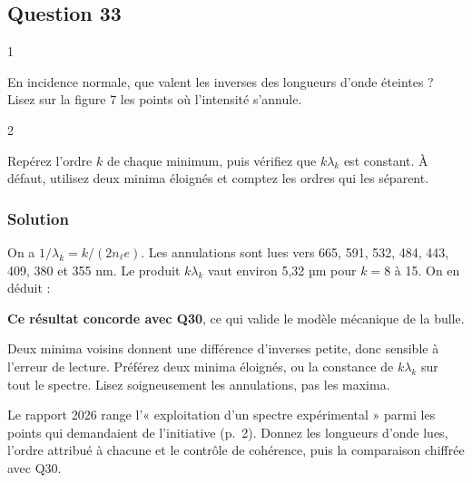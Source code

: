 \documentclass[11pt,a4paper]{article}
\newcommand{\equationajustee}[1]{%
  \sbox{\boiteequation}{$\displaystyle #1$}%
  \ifdim\wd\boiteequation>\linewidth
    \[\resizebox{\linewidth}{!}{\usebox{\boiteequation}}\]%
  \else
    \[#1\]%
  \fi}
\begin{document}
\hypertarget{question-33}{%
\subsection{Question 33}\label{question-33}}

\begin{indication}{1}

En incidence normale, que valent les inverses des longueurs d'onde éteintes ? Lisez sur la figure 7 les points où l'intensité s'annule.

\end{indication}

\begin{indication}{2}

Repérez l'ordre \(k\) de chaque minimum, puis vérifiez que \(k\lambda_k\) est constant. À défaut, utilisez deux minima éloignés et comptez les ordres qui les séparent.

\end{indication}

\hypertarget{solution-32}{%
\subsubsection{Solution}\label{solution-32}}

On a \(1/\lambda_k=k/(2n_\ell e)\). Les annulations sont lues vers 665, 591, 532, 484, 443, 409, 380 et 355 nm. Le produit \(k\lambda_k\) vaut environ 5,32 µm pour \(k=8\) à 15. On en déduit :

\equationajustee{e=\frac{5{,}32\ \mu\mathrm m}{2\times1{,}33}}

\equationajustee{\boxed{e\approx2{,}0\ \mu\mathrm m}}

\textbf{Ce résultat concorde avec Q30}, ce qui valide le modèle mécanique de la bulle.

\begin{piege}

Deux minima voisins donnent une différence d'inverses petite, donc sensible à l'erreur de lecture. Préférez deux minima éloignés, ou la constance de \(k\lambda_k\) sur tout le spectre. Lisez soigneusement les annulations, pas les maxima.

\end{piege}

\begin{jury}

Le rapport 2026 range l'« exploitation d'un spectre expérimental » parmi les points qui demandaient de l'initiative (p.~2). Donnez les longueurs d'onde lues, l'ordre attribué à chacune et le contrôle de cohérence, puis la comparaison chiffrée avec Q30.

\end{jury}
\end{document}
